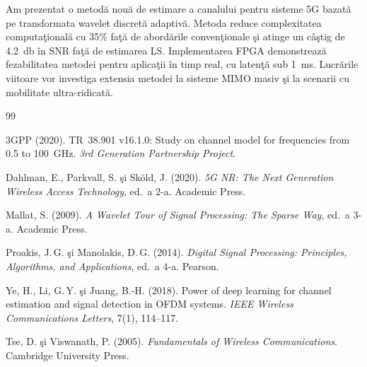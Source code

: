 \documentclass[12pt,a4paper]{article}
\begin{document}
Am prezentat o metodă nouă de estimare a canalului pentru sisteme
5G bazată pe transformata wavelet discretă adaptivă. Metoda reduce
complexitatea computaţională cu 35\% faţă de abordările
convenţionale şi atinge un câştig de \SI{4.2}{\decibel} în SNR faţă
de estimarea LS. Implementarea FPGA demonstrează fezabilitatea
metodei pentru aplicaţii în timp real, cu latenţă sub
\SI{1}{\milli\second}. Lucrările viitoare vor investiga extensia
metodei la sisteme MIMO masiv şi la scenarii cu mobilitate
ultra-ridicată.

\begin{thebibliography}{99}

3GPP (2020).
TR~38.901 v16.1.0: Study on channel model for frequencies from 0.5 to 100~GHz.
\emph{3rd Generation Partnership Project}.

Dahlman, E., Parkvall, S. \c{s}i Sk\"{o}ld, J. (2020).
\emph{5G NR: The Next Generation Wireless Access Technology}, ed.~a 2-a.
Academic Press.

Mallat, S. (2009).
\emph{A Wavelet Tour of Signal Processing: The Sparse Way}, ed.~a 3-a.
Academic Press.

Proakis, J.\,G. \c{s}i Manolakis, D.\,G. (2014).
\emph{Digital Signal Processing: Principles, Algorithms, and Applications},
ed.~a 4-a. Pearson.

Ye, H., Li, G.\,Y. \c{s}i Juang, B.-H. (2018).
Power of deep learning for channel estimation and signal detection in OFDM systems.
\emph{IEEE Wireless Communications Letters}, 7(1), 114--117.

Tse, D. \c{s}i Viswanath, P. (2005).
\emph{Fundamentals of Wireless Communications}.
Cambridge University Press.

\end{thebibliography}
\end{document}
